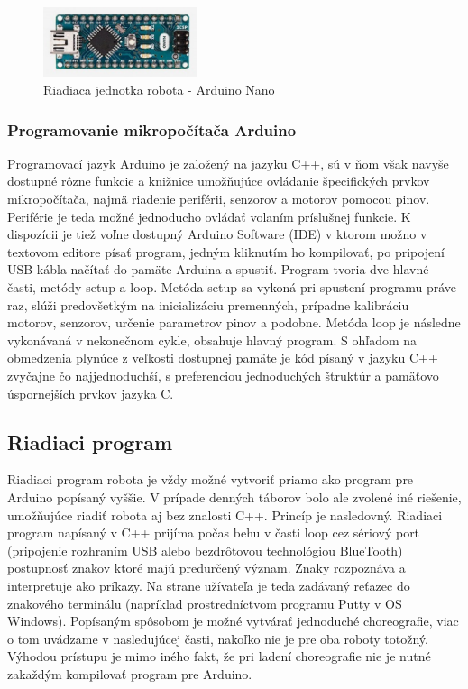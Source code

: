 \begin{figure}
\centerline{\includegraphics[width=0.4\textwidth]{images/arduino-nano}}
\caption[Riadiaca jednotka - Arduino Nano]{Riadiaca jednotka robota - Arduino Nano}
\label{obr:arduino}
\end{figure}

\subsubsection{Programovanie mikropočítača Arduino}
Programovací jazyk Arduino je založený na jazyku C++, sú v ňom však navyše dostupné rôzne funkcie a knižnice umožňujúce ovládanie špecifických prvkov mikropočítača, najmä riadenie periférii, senzorov a motorov pomocou pinov. \cite{ArduinoLanguage} Periférie je teda možné jednoducho ovládať volaním príslušnej funkcie. K dispozícii je tiež voľne dostupný Arduino Software (IDE) v ktorom možno v textovom editore písať program, jedným kliknutím ho kompilovať, po pripojení USB kábla načítať do pamäte Arduina a spustiť. Program tvoria dve hlavné časti, metódy setup a loop. Metóda setup sa vykoná pri spustení programu práve raz, slúži predovšetkým na  inicializáciu premenných, prípadne kalibráciu motorov, senzorov, určenie parametrov pinov a podobne. Metóda loop je následne vykonávaná v nekonečnom cykle, obsahuje hlavný program. S ohľadom na obmedzenia plynúce z veľkosti dostupnej pamäte je kód písaný v jazyku C++ zvyčajne čo najjednoduchší, s preferenciou jednoduchých štruktúr a pamäťovo úspornejších prvkov jazyka C.

\subsection{Riadiaci program}
Riadiaci program robota je vždy možné vytvoriť priamo ako program pre Arduino popísaný vyššie. V prípade denných táborov bolo ale zvolené iné riešenie, umožňujúce riadiť robota aj bez znalosti C++. Princíp je nasledovný. Riadiaci program napísaný v C++ prijíma počas behu v časti loop cez sériový port (pripojenie rozhraním USB alebo bezdrôtovou technológiou BlueTooth) postupnosť znakov ktoré majú predurčený význam. Znaky rozpoznáva a interpretuje ako príkazy. Na strane užívateľa je teda zadávaný reťazec do znakového terminálu (napríklad prostredníctvom programu Putty v OS Windows). Popísaným spôsobom je možné vytvárať jednoduché choreografie, viac o tom uvádzame v nasledujúcej časti, nakoľko nie je pre oba roboty totožný. Výhodou prístupu je mimo iného fakt, že pri ladení choreografie nie je nutné zakaždým kompilovať program pre Arduino. 


